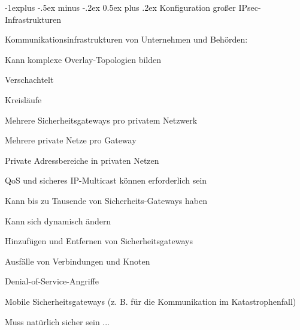 \documentclass[a4paper]{article}
\makeatletter
\renewcommand{\subsection}{\@startsection{subsection}{2}{0mm}%
 {-1explus -.5ex minus -.2ex}%
 {0.5ex plus .2ex}%
 {\normalfont\normalsize\bfseries}}
\makeatother
\begin{document}
\begin{multicols}{3}
      \subsection{Konfiguration großer IPsec-Infrastrukturen}
      \begin{itemize*}
            \item Kommunikationsinfrastrukturen von Unternehmen und Behörden:
            \item Kann komplexe Overlay-Topologien bilden
            \begin{itemize*}
                  \item Verschachtelt
                  \item Kreisläufe
                  \item Mehrere Sicherheitsgateways pro privatem Netzwerk
                  \item Mehrere private Netze pro Gateway
                  \item Private Adressbereiche in privaten Netzen
                  \item QoS und sicheres IP-Multicast können erforderlich sein
            \end{itemize*}
            \item Kann bis zu Tausende von Sicherheits-Gateways haben
            \item Kann sich dynamisch ändern
            \begin{itemize*}
                  \item Hinzufügen und Entfernen von Sicherheitsgateways
                  \item Ausfälle von Verbindungen und Knoten
                  \item Denial-of-Service-Angriffe
                  \item Mobile Sicherheitsgateways (z. B. für die Kommunikation im Katastrophenfall)
            \end{itemize*}
            \item Muss natürlich sicher sein ...
      \end{itemize*}


\end{multicols}
\end{document}
